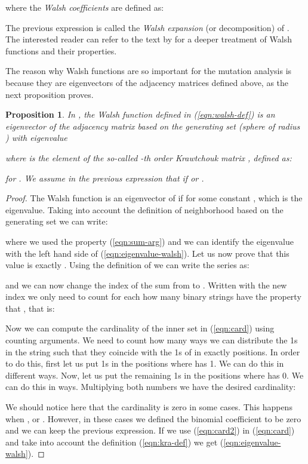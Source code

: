 \documentclass{article}
\newtheorem{proposition}{Proposition}
\begin{document}
where the \emph{Walsh coefficients}  are defined as:

The previous expression is called the \emph{Walsh expansion} (or decomposition) of . The interested reader can refer to the text by \citet{Terras1999} for a deeper treatment of Walsh functions and their properties.

The reason why Walsh functions are so important for the mutation analysis is because they are eigenvectors of the adjacency matrices  defined above, as the next proposition proves.

\begin{proposition}
\label{prop:eigenvalue-walsh}
In , the Walsh function  defined in (\ref{eqn:walsh-def}) is an eigenvector of the adjacency matrix  based on the generating set  (sphere of radius ) with eigenvalue

where  is the  element of the so-called -th order Krawtchouk matrix , defined as:

for . We assume in the previous expression that  if  or . 
\end{proposition}
\begin{proof}
The Walsh function  is an eigenvector of  if  for some constant , which is the eigenvalue. Taking into account the definition of neighborhood based on the generating set  we can write:

where we used the property (\ref{eqn:sum-arg}) and we can identify the eigenvalue with the left hand side of (\ref{eqn:eigenvalue-walsh}). Let us now prove that this value is exactly . Using the definition of  we can write the series as:

and we can now change the index of the sum from  to . Written with the new index we only need to count for each  how many binary strings  have the property that , that is:


Now we can compute the cardinality of the inner set in (\ref{eqn:card}) using counting arguments. We need to count how many ways we can distribute the  1s in the string  such that they coincide with the 1s of  in exactly  positions. In order to do this, first let us put  1s in the positions where  has 1. We can do this in  different ways. Now, let us put the remaining  1s in the positions where  has 0. We can do this in  ways. Multiplying both numbers we have the desired cardinality:


We should notice here that the cardinality is zero in some cases. This happens when ,  or . However, in these cases we defined the binomial coefficient to be zero and we can keep the previous expression. If we use (\ref{eqn:card2}) in (\ref{eqn:card}) and take into account the definition (\ref{eqn:kra-def}) we get (\ref{eqn:eigenvalue-walsh}).
\end{proof}
\end{document}
